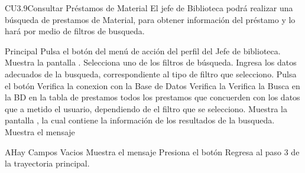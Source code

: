 
	\begin{UseCase}{CU3.9}{Consultar Préstamos de Material}{
		El jefe de Biblioteca podrá realizar una búsqueda de prestamos de Material, para obtener información del préstamo y lo hará por medio de filtros de busqueda.
	}
	\end{UseCase}
	\begin{UCtrayectoria}{Principal}
		\UCpaso[\UCactor] Pulsa el botón  del menú de acción del perfil del Jefe de biblioteca.
		\UCpaso[\UCsist]Muestra la pantalla .
		\UCpaso[\UCactor]Selecciona uno de los filtros de búsqueda.
		\UCpaso[\UCactor]Ingresa los datos adecuados de la busqueda, correspondiente al tipo de filtro que selecciono.
		\UCpaso[\UCactor]Pulsa el botón 
		\UCpaso[\UCsist]Verifica la conexion con la Base de Datos 
		\UCpaso[\UCsist]Verifica la  
		\UCpaso[\UCsist]Verifica la  
		\UCpaso[\UCsist]Busca en la BD en la tabla de prestamos todos los prestamos que concuerden con los datos que a metido el usuario, dependiendo de el filtro que se selecciono.
		\UCpaso[\UCsist] Muestra la pantalla , la cual contiene la información de los resultados de la busqueda.
		\UCpaso[\UCsist] Muestra el mensaje 
	\end{UCtrayectoria}
		\begin{UCtrayectoriaA}{A}{Hay Campos Vacios}
			\UCpaso[\UCsist] Muestra el mensaje 
			\UCpaso[\UCactor] Presiona el botón 
			\UCpaso[\UCsist] Regresa al paso 3 de la trayectoria principal.
		\end{UCtrayectoriaA}


